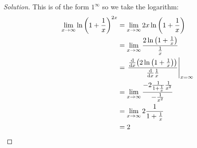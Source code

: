 \begin{enumerate}[(a)]
        \begin{proof}[Solution]
          This is of the form $1^\infty$ so we take the logarithm:
          \begin{align*}
            \lim_{x\to\infty} \ln \left(1 + \frac{1}{x}\right)^{2x}
             & = \lim_{x\to\infty} 2x\ln \left(1 + \frac{1}{x}\right)                            \\
             & = \lim_{x\to\infty} \frac{2\ln \left(1 + \frac{1}{x}\right)}{\frac1x}             \\
             & = \left.\frac{\dv{x}(2\ln \left(1 + \frac{1}{x}\right))}{\dv{x}\frac1x}\right|_{x=\infty}  \\
             & = \lim_{x\to\infty} \frac{-2\frac{1}{1+\frac{1}{x}}\frac{1}{x^2}}{-\frac{1}{x^2}} \\
             & = \lim_{x\to\infty} 2\frac{1}{1+\frac{1}{x}}                                      \\
             & = 2 \qedhere
          \end{align*}
        \end{proof}
\end{enumerate}


